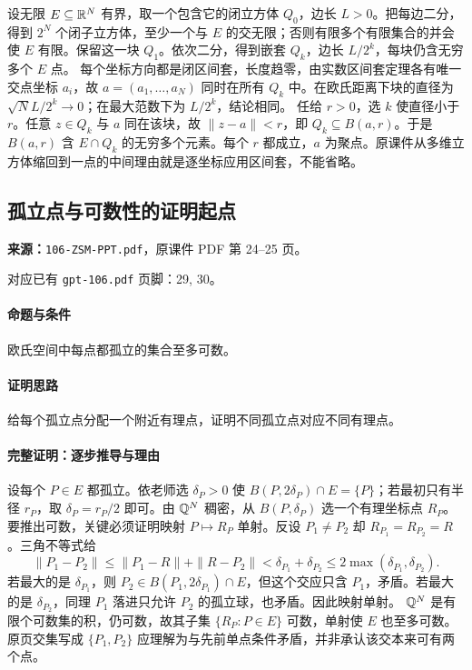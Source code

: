 设无限 $E\subseteq\mathbb{R}^N$ 有界，取一个包含它的闭立方体 $Q_0$，边长 $L>0$。把每边二分，得到 $2^N$ 个闭子立方体，至少一个与 $E$ 的交无限；否则有限多个有限集合的并会使 $E$ 有限。保留这一块 $Q_1$。依次二分，得到嵌套 $Q_k$，边长 $L/2^k$，每块仍含无穷多个 $E$ 点。
每个坐标方向都是闭区间套，长度趋零，由实数区间套定理各有唯一交点坐标 $a_i$，故 $a=(a_1,\ldots,a_N)$ 同时在所有 $Q_k$ 中。在欧氏距离下块的直径为 $\sqrt N L/2^k\to0$；在最大范数下为 $L/2^k$，结论相同。
任给 $r>0$，选 $k$ 使直径小于 $r$。任意 $z\in Q_k$ 与 $a$ 同在该块，故 $\|z-a\|<r$，即 $Q_k\subseteq B(a,r)$。于是 $B(a,r)$ 含 $E\cap Q_k$ 的无穷多个元素。每个 $r$ 都成立，$a$ 为聚点。原课件从多维立方体缩回到一点的中间理由就是逐坐标应用区间套，不能省略。

\clearpage\subsection{孤立点与可数性的证明起点}
\textbf{来源：}\texttt{106-ZSM-PPT.pdf}，原课件 PDF 第 24--25 页。\par
对应已有 \texttt{gpt-106.pdf} 页脚：29, 30。\par
\paragraph{命题与条件}欧氏空间中每点都孤立的集合至多可数。
\paragraph{证明思路}给每个孤立点分配一个附近有理点，证明不同孤立点对应不同有理点。
\paragraph{完整证明：逐步推导与理由}

设每个 $P\in E$ 都孤立。依老师选 $\delta_P>0$ 使 $B(P,2\delta_P)\cap E=\{P\}$；若最初只有半径 $r_P$，取 $\delta_P=r_P/2$ 即可。由 $\mathbb{Q}^N$ 稠密，从 $B(P,\delta_P)$ 选一个有理坐标点 $R_P$。
要推出可数，关键必须证明映射 $P\mapsto R_P$ 单射。反设 $P_1\ne P_2$ 却 $R_{P_1}=R_{P_2}=R$。三角不等式给
\[\|P_1-P_2\|\le\|P_1-R\|+\|R-P_2\|<\delta_{P_1}+\delta_{P_2}\le2\max(\delta_{P_1},\delta_{P_2}).\]
若最大的是 $\delta_{P_1}$，则 $P_2\in B(P_1,2\delta_{P_1})\cap E$，但这个交应只含 $P_1$，矛盾。若最大的是 $\delta_{P_2}$，同理 $P_1$ 落进只允许 $P_2$ 的孤立球，也矛盾。因此映射单射。
$\mathbb{Q}^N$ 是有限个可数集的积，仍可数，故其子集 $\{R_P:P\in E\}$ 可数，单射使 $E$ 也至多可数。原页交集写成 $\{P_1,P_2\}$ 应理解为与先前单点条件矛盾，并非承认该交本来可有两个点。

